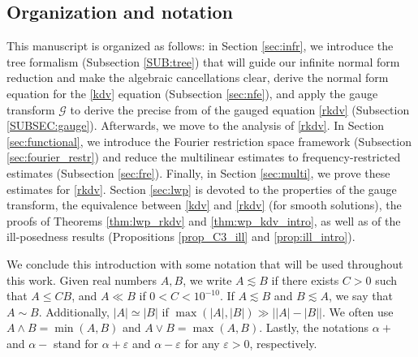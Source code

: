 \documentclass[a4paper,
11pt,  reqno]{amsart}
\newcommand{\5}{\textup{V}}
\newcommand{\andreia}[1]{\marginpar{\color{purple} $\Leftarrow\Leftarrow\Leftarrow$}{\smallskip \noi\color{purple}ANDREIA: #1}\smallskip}
\newcommand{\noi}{\noindent}
\newcommand{\les}{\lesssim}
\newcommand{\eps}{\varepsilon}
\theoremstyle{remark}
\newcommand{\R}{\mathbb{R}}
\newcommand{\al}{\alpha}
\newcommand{\Gc}{\mathcal{G}}
\numberwithin{equation}{section}
\numberwithin{theorem}{section}
\begin{document}




\subsection{Organization and notation} This manuscript is organized as follows: in Section \ref{sec:infr}, we introduce the tree formalism (Subsection \ref{SUB:tree}) that will guide our infinite normal form reduction and make the algebraic cancellations clear, derive the normal form equation for the \eqref{kdv} equation (Subsection \ref{sec:nfe}), and apply the gauge transform $\Gc$ to derive the precise from of the gauged equation \ref{rkdv} (Subsection \ref{SUBSEC:gauge}).
Afterwards, we move to the analysis of \eqref{rkdv}. In Section \ref{sec:functional}, we introduce the Fourier restriction space framework (Subsection \ref{sec:fourier_restr}) and reduce the multilinear estimates to frequency-restricted estimates (Subsection \ref{sec:fre}). Finally, in Section \ref{sec:multi}, we prove these estimates for \eqref{rkdv}. Section \ref{sec:lwp} is devoted to the properties of the gauge transform, the equivalence between \eqref{kdv} and \eqref{rkdv} (for smooth solutions), the proofs of Theorems \ref{thm:lwp_rkdv} and \ref{thm:wp_kdv_intro}, as well as of the ill-posedness results (Propositions \ref{prop_C3_ill} and \ref{prop:ill_intro}).

\bigskip

We conclude this introduction with some notation that will be used throughout this work. Given real numbers $A,B$, we write $A \les B$ if there exists $C>0$ such that $A \le CB$, and $A \ll B$ if $0<C< 10^{-10}$. If $A\les B$ and $B\les A$, we say that $A\sim B$. Additionally, $|A| \simeq |B|$ if $\max(|A|,|B|) \gg \big| |A| - |B| \big|$.
We often use $A \land B = \min(A,B)$ and $A \lor B = \max(A,B)$.
Lastly,
the notations $\al +$ and $\al-$ stand for $\al+\eps$ and $\al-\eps$ for any $\eps>0$, respectively.
\end{document}
